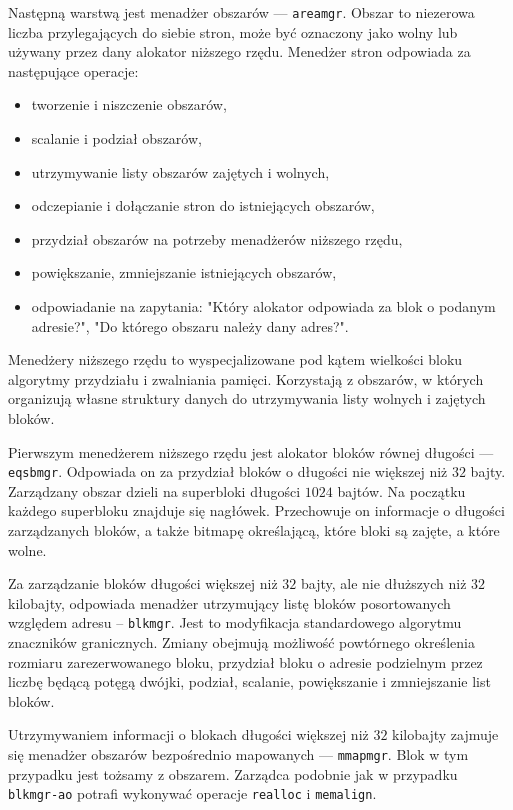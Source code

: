\documentclass[12pt,a4paper,titlepage,twoside]{mwart}
\begin{document}
Następną warstwą jest menadżer obszarów --- \texttt{areamgr}. Obszar to
niezerowa liczba przylegających do siebie stron, może być oznaczony jako wolny
lub używany przez dany alokator niższego rzędu. Menedżer stron odpowiada za
następujące operacje:
\begin{itemize}
\item tworzenie i niszczenie obszarów,
\item scalanie i podział obszarów,
\item utrzymywanie listy obszarów zajętych i wolnych,
\item odczepianie i dołączanie stron do istniejących obszarów,
\item przydział obszarów na potrzeby menadżerów niższego rzędu,
\item powiększanie, zmniejszanie istniejących obszarów,
\item odpowiadanie na zapytania: "Który alokator odpowiada za blok o podanym
adresie?", "Do którego obszaru należy dany adres?".
\end{itemize}

Menedżery niższego rzędu to wyspecjalizowane pod kątem wielkości bloku
algorytmy przydziału i zwalniania pamięci. Korzystają z obszarów, w których
organizują własne struktury danych do utrzymywania listy wolnych i zajętych
bloków.

Pierwszym menedżerem niższego rzędu jest alokator bloków równej długości ---
\texttt{eqsbmgr}.  Odpowiada on za przydział bloków o długości nie większej niż
$32$ bajty.  Zarządzany obszar dzieli na superbloki długości $1024$ bajtów. Na
początku każdego superbloku znajduje się nagłówek. Przechowuje on informacje o
długości zarządzanych bloków, a także bitmapę określającą, które bloki
są zajęte, a które wolne.

Za zarządzanie bloków długości większej niż $32$ bajty, ale nie dłuższych niż
$32$ kilobajty, odpowiada menadżer utrzymujący listę bloków posortowanych
względem adresu -- \texttt{blkmgr}. Jest to modyfikacja standardowego algorytmu
znaczników granicznych. Zmiany obejmują możliwość powtórnego określenia rozmiaru
zarezerwowanego bloku, przydział bloku o adresie podzielnym przez liczbę będącą
potęgą dwójki, podział, scalanie, powiększanie i zmniejszanie list bloków.

Utrzymywaniem informacji o blokach długości większej niż $32$ kilobajty zajmuje
się menadżer obszarów bezpośrednio mapowanych --- \texttt{mmapmgr}. Blok w tym
przypadku jest tożsamy z obszarem. Zarządca podobnie jak w przypadku
\texttt{blkmgr-ao} potrafi wykonywać operacje \texttt{realloc} i
\texttt{memalign}.
\end{document}
